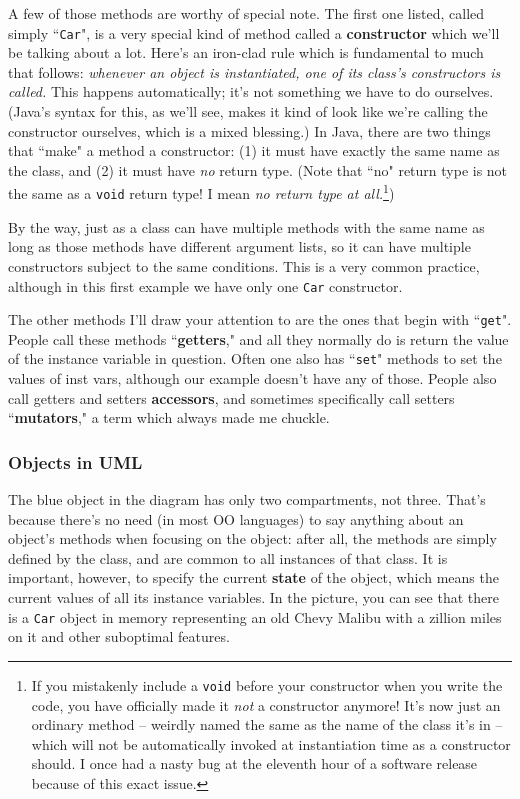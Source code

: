A few of those methods are worthy of special note. The first one listed,
called simply ``\texttt{Car}", is a very special kind of method called a
\textbf{constructor} which we'll be talking about a lot. Here's an iron-clad
rule which is fundamental to much that follows: \textit{whenever an object is
instantiated, one of its class's constructors is called.} This happens
automatically; it's not something we have to do ourselves. (Java's syntax for
this, as we'll see, makes it kind of look like we're calling the constructor
ourselves, which is a mixed blessing.) In Java, there are two things that
``make" a method a constructor: (1) it must have exactly the same name as the
class, and (2) it must have \textit{no} return type. (Note that ``no" return
type is not the same as a \texttt{void} return type! I mean \textit{no return
type at all.}\footnote{If you mistakenly include a \texttt{void} before your
constructor when you write the code, you have officially made it \textit{not}
a constructor anymore! It's now just an ordinary method -- weirdly named the
same as the name of the class it's in -- which will not be automatically
invoked at instantiation time as a constructor should. I once had a nasty bug
at the eleventh hour of a software release because of this exact issue.})

By the way, just as a class can have multiple methods with the same name as
long as those methods have different argument lists, so it can have multiple
constructors subject to the same conditions. This is a very common practice,
although in this first example we have only one \texttt{Car} constructor.

The other methods I'll draw your attention to are the ones that begin with
``\texttt{get}". People call these methods ``\textbf{getters}," and all they
normally do is return the value of the instance variable in question. Often
one also has ``\texttt{set}" methods to set the values of inst vars, although
our example doesn't have any of those. People also call getters and setters
\textbf{accessors}, and sometimes specifically call setters
``\textbf{mutators}," a term which always made me chuckle.

\subsubsection{Objects in UML}

The blue object in the diagram has only two compartments, not three. That's
because there's no need (in most OO languages) to say anything about an
object's methods when focusing on the object: after all, the methods are
simply defined by the class, and are common to all instances of that class. It
is important, however, to specify the current \textbf{state} of the object,
which means the current values of all its instance variables. In the picture,
you can see that there is a \texttt{Car} object in memory representing an old
Chevy Malibu with a zillion miles on it and other suboptimal features.

